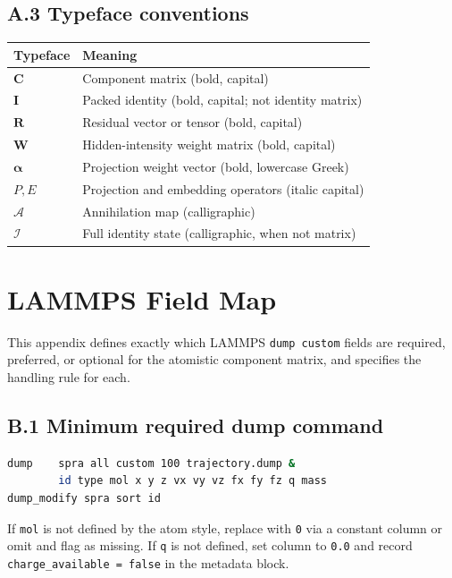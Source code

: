 \documentclass[11pt, a4paper, oneside]{article}
\begin{document}
\begin{appendices}
\subsection*{A.3 Typeface conventions}

\begin{tabular}{ll}
  \toprule
  Typeface & Meaning \\
  \midrule
  $\mathbf{C}$ & Component matrix (bold, capital) \\
  $\mathbf{I}$ & Packed identity (bold, capital; not identity matrix) \\
  $\mathbf{R}$ & Residual vector or tensor (bold, capital) \\
  $\mathbf{W}$ & Hidden-intensity weight matrix (bold, capital) \\
  $\bm{\alpha}$ & Projection weight vector (bold, lowercase Greek) \\
  $P, E$ & Projection and embedding operators (italic capital) \\
  $\mathcal{A}$ & Annihilation map (calligraphic) \\
  $\mathcal{I}$ & Full identity state (calligraphic, when not matrix) \\
  \bottomrule
\end{tabular}

\section{LAMMPS Field Map}
\label{app:B}

This appendix defines exactly which LAMMPS \texttt{dump custom} fields are
required, preferred, or optional for the atomistic component matrix, and
specifies the handling rule for each.

\subsection*{B.1 Minimum required dump command}

\begin{lstlisting}[language=bash, caption={Minimum LAMMPS dump for
	Scale-Packing analysis}]
dump    spra all custom 100 trajectory.dump &
		id type mol x y z vx vy vz fx fy fz q mass
dump_modify spra sort id
\end{lstlisting}

If \texttt{mol} is not defined by the atom style, replace with \texttt{0}
via a constant column or omit and flag as missing.
If \texttt{q} is not defined, set column to \texttt{0.0} and record
\texttt{charge\_available = false} in the metadata block.


\end{appendices}
\end{document}
